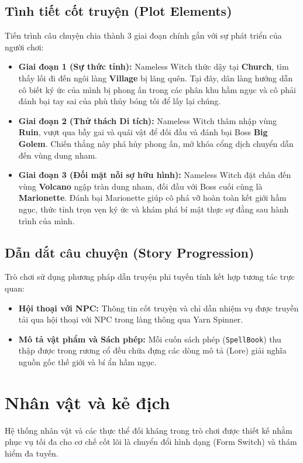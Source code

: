\documentclass[../DoAn.tex]{subfiles}
\begin{document}
\subsection{Tình tiết cốt truyện (Plot Elements)}
Tiến trình câu chuyện chia thành 3 giai đoạn chính gắn với sự phát triển của người chơi:
\begin{itemize}
    \item \textbf{Giai đoạn 1 (Sự thức tỉnh):} Nameless Witch thức dậy tại \textbf{Church}, tìm thấy lối đi đến ngôi làng \textbf{Village} bị lãng quên. Tại đây, dân làng hướng dẫn cô biết ký ức của mình bị phong ấn trong các phân khu hầm ngục và cô phải đánh bại tay sai của phù thủy bóng tối để lấy lại chúng.
    \item \textbf{Giai đoạn 2 (Thử thách Di tích):} Nameless Witch thâm nhập vùng \textbf{Ruin}, vượt qua bẫy gai và quái vật để đối đầu và đánh bại Boss \textbf{Big Golem}. Chiến thắng này phá hủy phong ấn, mở khóa cổng dịch chuyển dẫn đến vùng dung nham.
    \item \textbf{Giai đoạn 3 (Đối mặt nỗi sợ hữu hình):} Nameless Witch đặt chân đến vùng \textbf{Volcano} ngập tràn dung nham, đối đầu với Boss cuối cùng là \textbf{Marionette}. Đánh bại Marionette giúp cô phá vỡ hoàn toàn kết giới hầm ngục, thức tỉnh trọn vẹn ký ức và khám phá bí mật thực sự đằng sau hành trình của mình.
\end{itemize}

\subsection{Dẫn dắt câu chuyện (Story Progression)}
Trò chơi sử dụng phương pháp dẫn truyện phi tuyến tính kết hợp tương tác trực quan:
\begin{itemize}
    \item \textbf{Hội thoại với NPC:} Thông tin cốt truyện và chỉ dẫn nhiệm vụ được truyền tải qua hội thoại với NPC trong làng thông qua Yarn Spinner.
    \item \textbf{Mô tả vật phẩm và Sách phép:} Mỗi cuốn sách phép (\texttt{SpellBook}) thu thập được trong rương cổ đều chứa đựng các dòng mô tả (Lore) giải nghĩa nguồn gốc thế giới và bí ẩn hầm ngục.
\end{itemize}

\section{Nhân vật và kẻ địch}
\label{section:3.6}

Hệ thống nhân vật và các thực thể đối kháng trong trò chơi được thiết kế nhằm phục vụ tối đa cho cơ chế cốt lõi là chuyển đổi hình dạng (Form Switch) và thám hiểm đa tuyến.
\end{document}
